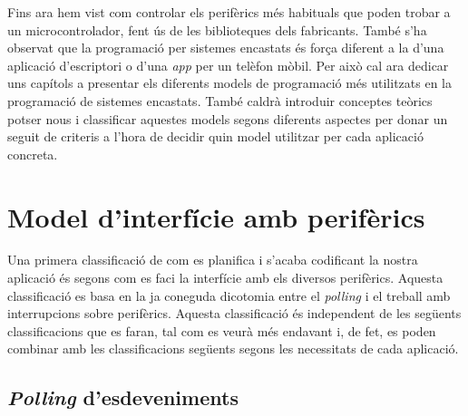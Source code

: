 



Fins ara hem vist com controlar els perifèrics més habituals que poden trobar a un microcontrolador, fent ús de les biblioteques dels fabricants. 
També s'ha observat que la programació per sistemes encastats és força diferent a la d'una aplicació d'escriptori o d'una {\em app} per un telèfon mòbil. Per això cal ara dedicar uns capítols a presentar els diferents models de programació més utilitzats en la programació de sistemes encastats. També caldrà introduir conceptes teòrics potser nous i classificar aquestes models segons diferents aspectes per donar un seguit de criteris a l'hora de decidir quin model utilitzar per cada aplicació concreta.

\chapter{Model d'interfície amb perifèrics}
\label{ch:modelinterficie}

Una primera classificació de com es planifica i s'acaba codificant la nostra aplicació és segons com es faci la interfície amb els diversos perifèrics. Aquesta classificació es basa en la ja coneguda dicotomia entre el {\em polling} i el treball amb interrupcions sobre perifèrics. Aquesta classificació és independent de les següents classificacions que es faran, tal com es veurà més endavant i, de fet, es poden combinar amb les classificacions següents segons les necessitats de cada aplicació.

\section{{\em Polling} d'esdeveniments}
\label{sec:polling}


